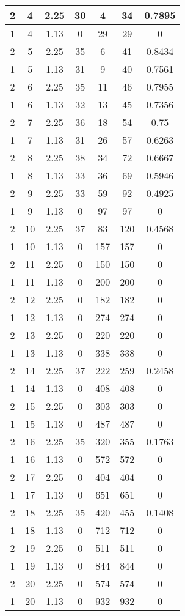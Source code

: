\documentclass[letterpaper, 12pt]{article}
\begin{document}
\begin{longtable}{|c|c|c|c|c|c|c|}
\hline
2 & 4 & 2.25 & 30 & 4 & 34 & 0.7895 \\
\hline
1 & 4 & 1.13 & 0 & 29 & 29 & 0 \\
\hline
2 & 5 & 2.25 & 35 & 6 & 41 & 0.8434 \\
\hline
1 & 5 & 1.13 & 31 & 9 & 40 & 0.7561 \\
\hline
2 & 6 & 2.25 & 35 & 11 & 46 & 0.7955 \\
\hline
1 & 6 & 1.13 & 32 & 13 & 45 & 0.7356 \\
\hline
2 & 7 & 2.25 & 36 & 18 & 54 & 0.75 \\
\hline
1 & 7 & 1.13 & 31 & 26 & 57 & 0.6263 \\
\hline
2 & 8 & 2.25 & 38 & 34 & 72 & 0.6667 \\
\hline
1 & 8 & 1.13 & 33 & 36 & 69 & 0.5946 \\
\hline
2 & 9 & 2.25 & 33 & 59 & 92 & 0.4925 \\
\hline
1 & 9 & 1.13 & 0 & 97 & 97 & 0 \\
\hline
2 & 10 & 2.25 & 37 & 83 & 120 & 0.4568 \\
\hline
1 & 10 & 1.13 & 0 & 157 & 157 & 0 \\
\hline
2 & 11 & 2.25 & 0 & 150 & 150 & 0 \\
\hline
1 & 11 & 1.13 & 0 & 200 & 200 & 0 \\
\hline
2 & 12 & 2.25 & 0 & 182 & 182 & 0 \\
\hline
1 & 12 & 1.13 & 0 & 274 & 274 & 0 \\
\hline
2 & 13 & 2.25 & 0 & 220 & 220 & 0 \\
\hline
1 & 13 & 1.13 & 0 & 338 & 338 & 0 \\
\hline
2 & 14 & 2.25 & 37 & 222 & 259 & 0.2458 \\
\hline
1 & 14 & 1.13 & 0 & 408 & 408 & 0 \\
\hline
2 & 15 & 2.25 & 0 & 303 & 303 & 0 \\
\hline
1 & 15 & 1.13 & 0 & 487 & 487 & 0 \\
\hline
2 & 16 & 2.25 & 35 & 320 & 355 & 0.1763 \\
\hline
1 & 16 & 1.13 & 0 & 572 & 572 & 0 \\
\hline
2 & 17 & 2.25 & 0 & 404 & 404 & 0 \\
\hline
1 & 17 & 1.13 & 0 & 651 & 651 & 0 \\
\hline
2 & 18 & 2.25 & 35 & 420 & 455 & 0.1408 \\
\hline
1 & 18 & 1.13 & 0 & 712 & 712 & 0 \\
\hline
2 & 19 & 2.25 & 0 & 511 & 511 & 0 \\
\hline
1 & 19 & 1.13 & 0 & 844 & 844 & 0 \\
\hline
2 & 20 & 2.25 & 0 & 574 & 574 & 0 \\
\hline
1 & 20 & 1.13 & 0 & 932 & 932 & 0 \\
\hline
\end{longtable}
\end{document}
